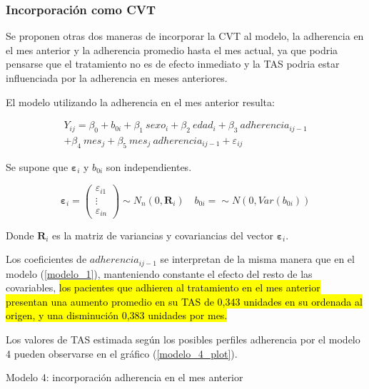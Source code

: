 \documentclass[spanish]{article}
\numberwithin{figure}{subsection}
\numberwithin{equation}{subsection}
\numberwithin{table}{subsection}
\begin{document}
\subsubsection{Incorporación como CVT}

Se proponen otras dos maneras de incorporar la CVT al modelo, la adherencia en
el mes anterior y la adherencia promedio hasta el mes actual, ya que podria
pensarse que el tratamiento no es de efecto inmediato y la TAS podria estar
influenciada por la adherencia en meses anteriores.

El modelo utilizando la adherencia en el mes anterior resulta:

\begin{multline}
	\label{modelo_4}
	Y_{ij} = \beta_0 + b_{0i} + \beta_1\ sexo_i + \beta_2\ edad_i + \beta_3\ adherencia_{ij-1} \\
	+ \beta_4\ mes_j + \beta_5\ mes_j\ adherencia_{ij-1} + \varepsilon_{ij}
\end{multline}

Se supone que $\bm{\varepsilon}_i$ y $b_{0i}$ son independientes.

\[ 
	\bm{\varepsilon}_i = \begin{pmatrix} \varepsilon_{i1} \\ \vdots \\ \varepsilon_{in} \end{pmatrix} \sim N_{n}(0, \bm{R}_i)
	\quad
	b_{0i} = \sim N(0, Var(b_{0i}))
\]

Donde $\bm{R}_i$ es la matriz de variancias y covariancias del vector
$\bm{\varepsilon}_i$.

Los coeficientes de $adherencia_{ij-1}$ se interpretan de la misma manera que en
el modelo (\ref{modelo_1}), manteniendo constante el efecto del resto de las
covariables, \hl{los pacientes que adhieren al tratamiento en el mes anterior
presentan una aumento promedio en su TAS de 0,343 unidades en su ordenada al
origen, y una disminución 0,383 unidades por mes.}

Los valores de TAS estimada según los posibles perfiles adherencia por el modelo
4 pueden observarse en el gráfico (\ref{modelo_4_plot}).

\begin{table}[H]
	\centering
	\caption{Modelo 4: incorporación adherencia en el mes anterior}
	\label{modelo_4_tabla}
	
\end{table}
\end{document}
